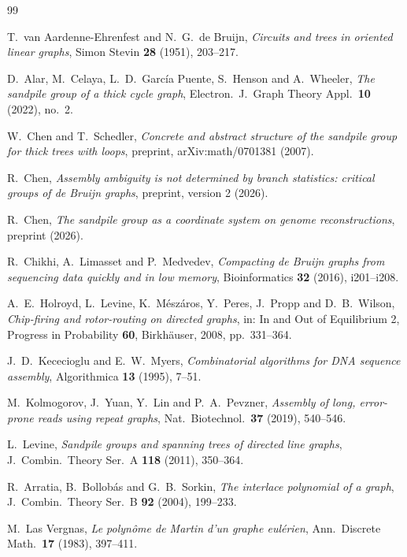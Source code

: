 \documentclass[11pt]{article}
\theoremstyle{plain}
\theoremstyle{definition}
\theoremstyle{remark}
\begin{document}
\begin{thebibliography}{99}

 T.~van Aardenne-Ehrenfest and N.~G.~de Bruijn,
\emph{Circuits and trees in oriented linear graphs},
Simon Stevin \textbf{28} (1951), 203--217.

 D.~Alar, M.~Celaya, L.~D.~Garc\'ia Puente, S.~Henson and A.~Wheeler,
\emph{The sandpile group of a thick cycle graph},
Electron.\ J.\ Graph Theory Appl.\ \textbf{10} (2022), no.~2.

 W.~Chen and T.~Schedler,
\emph{Concrete and abstract structure of the sandpile group for thick trees with loops},
preprint, arXiv:math/0701381 (2007).

 R.~Chen,
\emph{Assembly ambiguity is not determined by branch statistics: critical groups of de
Bruijn graphs}, preprint, version 2 (2026).

 R.~Chen,
\emph{The sandpile group as a coordinate system on genome reconstructions},
preprint (2026).

 R.~Chikhi, A.~Limasset and P.~Medvedev,
\emph{Compacting de Bruijn graphs from sequencing data quickly and in low memory},
Bioinformatics \textbf{32} (2016), i201--i208.

 A.~E.~Holroyd, L.~Levine, K.~M\'esz\'aros, Y.~Peres, J.~Propp and
D.~B.~Wilson, \emph{Chip-firing and rotor-routing on directed graphs},
in: In and Out of Equilibrium 2, Progress in Probability \textbf{60}, Birkh\"auser, 2008,
pp.~331--364.

 J.~D.~Kececioglu and E.~W.~Myers,
\emph{Combinatorial algorithms for DNA sequence assembly},
Algorithmica \textbf{13} (1995), 7--51.

 M.~Kolmogorov, J.~Yuan, Y.~Lin and P.~A.~Pevzner,
\emph{Assembly of long, error-prone reads using repeat graphs},
Nat.\ Biotechnol.\ \textbf{37} (2019), 540--546.

 L.~Levine,
\emph{Sandpile groups and spanning trees of directed line graphs},
J.\ Combin.\ Theory Ser.~A \textbf{118} (2011), 350--364.

 R.~Arratia, B.~Bollob\'as and G.~B.~Sorkin,
\emph{The interlace polynomial of a graph},
J.\ Combin.\ Theory Ser.~B \textbf{92} (2004), 199--233.

 M.~Las Vergnas,
\emph{Le polyn\^ome de Martin d'un graphe eul\'erien},
Ann.\ Discrete Math.\ \textbf{17} (1983), 397--411.


\end{thebibliography}
\end{document}
